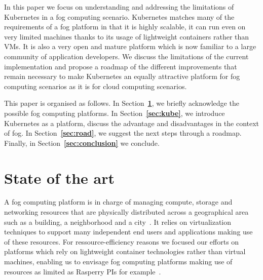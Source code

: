 \documentclass[letterpaper,twocolumn,10pt]{article}
\let\origref\ref
\def\ref#1{\textbf{\origref{#1}}}
\begin{document}
In this paper we focus on understanding and addressing the limitations
of Kubernetes in a fog computing scenario. Kubernetes matches many of
the requirements of a fog platform in that it is highly scalable, it
can run even on very limited machines thanks to its usage of
lightweight containers rather than VMs. It is also a very open and
mature platform which is now familiar to a large community of
application developers. We discuss the limitations of the current
implementation and propose a roadmap of the different improvements
that remain necessary to make Kubernetes an equally attractive
platform for fog computing scenarios as it is for cloud computing
scenarios.




This paper is organised as follows. In Section~\ref{sec:plat}, we
briefly acknowledge the possible fog computing platforms. In
Section~\ref{sec:kube}, we introduce Kubernetes as a platform, discuss
the advantage and disadvantages in the context of fog. In
Section~\ref{sec:road}, we suggest the next steps through a
roadmap. Finally, in Section~\ref{sec:conclusion} we conclude.


\section{State of the art}\label{sec:plat}

A fog computing platform is in charge of managing compute, storage and
networking resources that are physically distributed across a
geographical area such as a building, a neighborhood and a
city~\cite{bonomi2014, fogecosystem}. It relies
on virtualization techniques to support many independent end users and
applications making use of these resources. For ressource-efficiency
reasons we focused our efforts on platforms which rely on lightweight
container technologies rather than virtual machines, enabling us to
envisage fog computing platforms making use of resources as limited as
Rasperry PIs for example~\cite{vankempen:hal-01446483}.
\end{document}

